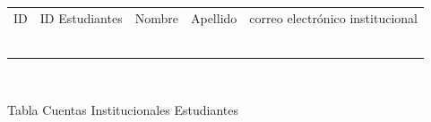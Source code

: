 \documentclass[letterpaper,10pt,spanish]{sphinxmanual}
\begin{document}
\begin{savenotes}\sphinxattablestart
\sphinxthistablewithglobalstyle
\centering
{}
\sphinxthecaptionisattop
{}\label{\detokenize{1_guias/8logica/G822:id13}}
\sphinxaftertopcaption
\begin{tabular}[t]{*{1}{}}
\sphinxtoprule
\sphinxtableatstartofbodyhook

\begin{savenotes}\sphinxattablestart
\sphinxthistablewithglobalstyle
\centering
\begin{tabulary}{\linewidth}[t]{TTTTT}
\sphinxtoprule
\sphinxstyletheadfamily 
\sphinxAtStartPar
ID
&\sphinxstyletheadfamily 
\sphinxAtStartPar
ID Estudiantes
&\sphinxstyletheadfamily 
\sphinxAtStartPar
Nombre
&\sphinxstyletheadfamily 
\sphinxAtStartPar
Apellido
&\sphinxstyletheadfamily 
\sphinxAtStartPar
correo electrónico institucional
\\
\sphinxmidrule
\sphinxtableatstartofbodyhook
{}
&&&&\\
\sphinxhline
{}
&&&&\\
\sphinxhline
{}
&&&&\\
\sphinxhline
{}
&&&&\\
\sphinxhline
{}
&&&&\\
\sphinxbottomrule
\end{tabulary}
\sphinxtableafterendhook\par
\sphinxattableend\end{savenotes}
\\
\sphinxhline
\begin{center}Tabla Cuentas Institucionales Estudiantes
\end{center}\\
\sphinxbottomrule
\end{tabular}
\sphinxtableafterendhook\par
\sphinxattableend\end{savenotes}
\end{document}
